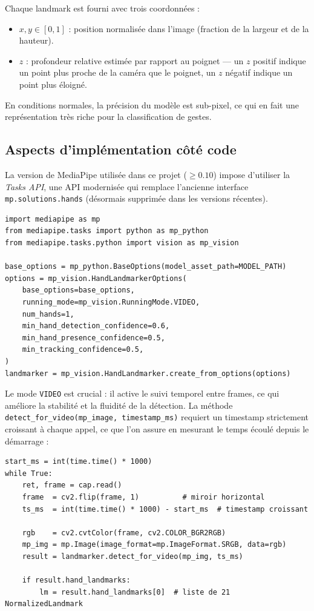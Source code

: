 \documentclass[12pt, a4paper]{article}
\newcommand{\code}[1]{\texttt{\small #1}}
\begin{document}
Chaque landmark est fourni avec trois coordonnées :
\begin{itemize}
  \item \(x, y \in [0, 1]\) : position normalisée dans l'image (fraction de la largeur
        et de la hauteur).
  \item \(z\) : profondeur relative estimée par rapport au poignet --- un \(z\) positif
        indique un point plus proche de la caméra que le poignet, un \(z\) négatif
        indique un point plus éloigné.
\end{itemize}

En conditions normales, la précision du modèle est sub-pixel, ce qui en fait une
représentation très riche pour la classification de gestes.

\subsection{Aspects d'implémentation côté code}

La version de MediaPipe utilisée dans ce projet (\(\geq 0.10\)) impose d'utiliser
la \emph{Tasks API}, une API modernisée qui remplace l'ancienne interface
\code{mp.solutions.hands} (désormais supprimée dans les versions récentes).

\begin{lstlisting}[caption={Initialisation de MediaPipe HandLandmarker (Tasks API)},
                   label=lst:mediapipe_init]
import mediapipe as mp
from mediapipe.tasks import python as mp_python
from mediapipe.tasks.python import vision as mp_vision

base_options = mp_python.BaseOptions(model_asset_path=MODEL_PATH)
options = mp_vision.HandLandmarkerOptions(
    base_options=base_options,
    running_mode=mp_vision.RunningMode.VIDEO,
    num_hands=1,
    min_hand_detection_confidence=0.6,
    min_hand_presence_confidence=0.5,
    min_tracking_confidence=0.5,
)
landmarker = mp_vision.HandLandmarker.create_from_options(options)
\end{lstlisting}

Le mode \code{VIDEO} est crucial : il active le suivi temporel entre frames,
ce qui améliore la stabilité et la fluidité de la détection. La méthode
\code{detect\_for\_video(mp\_image, timestamp\_ms)} requiert un timestamp
strictement croissant à chaque appel, ce que l'on assure en mesurant le temps
écoulé depuis le démarrage :

\begin{lstlisting}[caption={Boucle de capture et détection MediaPipe},
                   label=lst:mediapipe_loop]
start_ms = int(time.time() * 1000)
while True:
    ret, frame = cap.read()
    frame  = cv2.flip(frame, 1)          # miroir horizontal
    ts_ms  = int(time.time() * 1000) - start_ms  # timestamp croissant

    rgb    = cv2.cvtColor(frame, cv2.COLOR_BGR2RGB)
    mp_img = mp.Image(image_format=mp.ImageFormat.SRGB, data=rgb)
    result = landmarker.detect_for_video(mp_img, ts_ms)

    if result.hand_landmarks:
        lm = result.hand_landmarks[0]  # liste de 21 NormalizedLandmark
\end{lstlisting}
\end{document}
